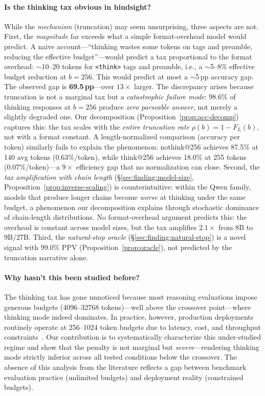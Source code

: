 
\paragraph{Is the thinking tax obvious in hindsight?}
While the \emph{mechanism} (truncation) may seem unsurprising, three aspects are not.
First, the \emph{magnitude} far exceeds what a simple format-overhead model would predict.
A naive account---``thinking wastes some tokens on tags and preamble, reducing the effective budget''---would predict a tax proportional to the format overhead: ${\sim}$10--20 tokens for \texttt{<think>} tags and preamble, i.e., a ${\sim}$5--8\% effective budget reduction at $b{=}256$.
This would predict at most a ${\sim}$5\,pp accuracy gap.
The observed gap is \textbf{69.5\,pp}---over $13\times$ larger.
The discrepancy arises because truncation is not a marginal tax but a \emph{catastrophic failure mode}: 98.6\% of thinking responses at $b{=}256$ produce \emph{zero parseable answer}, not merely a slightly degraded one.
Our decomposition (Proposition~\ref{prop:acc-decomp}) captures this: the tax scales with the \emph{entire truncation rate} $\rho(b) = 1 - F_L(b)$, not with a format constant.
A length-normalized comparison (accuracy per token) similarly fails to explain the phenomenon: nothink@256 achieves 87.5\% at 140 avg tokens (0.63\%/token), while think@256 achieves 18.0\% at 255 tokens (0.07\%/token)---a $9\times$ efficiency gap that no normalization can close.
Second, the \emph{tax amplification with chain length} (\S\ref{sec:finding:model-size}, Proposition~\ref{prop:inverse-scaling}) is counterintuitive: within the Qwen family, models that produce longer chains become \emph{worse} at thinking under the same budget, a phenomenon our decomposition explains through stochastic dominance of chain-length distributions.
No format-overhead argument predicts this: the overhead is constant across model sizes, but the tax amplifies $2.1\times$ from 8B to 9B/27B.
Third, the \emph{natural-stop oracle} (\S\ref{sec:finding:natural-stop}) is a novel signal with 99.0\% PPV (Proposition~\ref{prop:oracle}), not predicted by the truncation narrative alone.

\paragraph{Why hasn't this been studied before?}
The thinking tax has gone unnoticed because most reasoning evaluations impose generous budgets (4096--32768 tokens)---well above the crossover point---where thinking mode indeed dominates.
In practice, however, production deployments routinely operate at 256--1024 token budgets due to latency, cost, and throughput constraints~\citep{snell2024scaling}.
Our contribution is to systematically characterize this under-studied regime and show that the penalty is not marginal but \emph{severe}---rendering thinking mode strictly inferior across all tested conditions below the crossover.
The absence of this analysis from the literature reflects a gap between benchmark evaluation practice (unlimited budgets) and deployment reality (constrained budgets).

